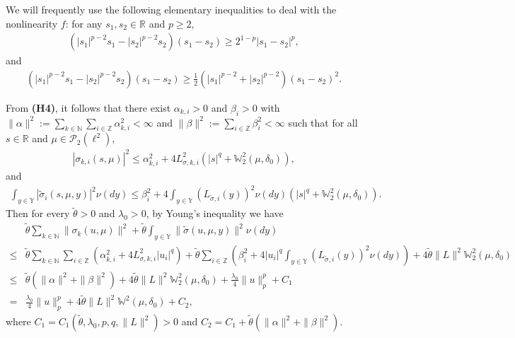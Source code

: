 \documentclass[11pt]{article}
\numberwithin{equation}{section}
\theoremstyle{plain}
\begin{document}
 We will frequently use the following elementary inequalities to deal with 
 the nonlinearity $f$:
 for any $ s_1, s_2 \in \mathbb{R} $ and $ p \ge 2 $,
 \begin{align*}
   \left( |s_1|^{ p-2 } s_1 - |s_2|^{p-2} s_2 \right) (s_1 - s_2)
    \ge 2^{1-p} |s_1 - s_2|^p,
 \end{align*}
 and
 \begin{align*}
   (|s_1|^{p-2} s_1 - |s_2|^{p-2} s_2)(s_1 - s_2)
   \ge \frac{1}{2} (|s_1|^{p-2} + |s_2|^{p-2}) (s_1 - s_2)^2.
 \end{align*}

  From {\bf(H4)}, it follows that there exist 
   $\alpha_{k,i}>0$
   and
   $\beta_i>0$
     with
    $\| \alpha \|^2 := \sum_{k \in \mathbb{N}} \sum_{i \in \mathbb{Z}} \alpha_{k,i}^2 <  \infty$
    and $\| \beta \|^2 :=   \sum_{i \in \mathbb{Z}} \beta_{i}^2 <  \infty$
    such that for all $s \in \mathbb{R}$ and $\mu \in \mathcal{P}_2(\ell^2)$,
 \begin{align}\label{siglinear-1}
    |\sigma_{k,i}(s, \mu)|^2
    \le   \alpha_{k,i}^2
         + 4L_{\sigma, k,i}^2
           \left( |s|^{q}
                  + \mathbb{W}^2_2(\mu,\delta_0)
           \right),
 \end{align}
 and
 \begin{align}\label{siglinear-2}
     \int_{y\in \mathbb{Y} }
              |\widetilde{\sigma}_i(s, \mu, y)| ^2 \nu (dy)
    \le \beta_{i}^2
         + 4 \int_{y\in \mathbb{Y} }
            \left( L_{ \widetilde{\sigma}, i}(y)
            \right)^2 \nu(dy)
            \left( |s|^{q}
                     + \mathbb{W}^2_2(\mu, \delta_0)
            \right).
 \end{align}
  Then for  every  $\tilde{\theta} > 0$
  and $\lambda_0>0$, 
  by Young's inequality we have
 \begin{align}\label{sigma3}
       & \tilde{\theta}\sum_{k \in \mathbb{N}}  \|\sigma_k(u,\mu)\|^2
           +  \tilde{\theta} \int_{y \in \mathbb{Y} } \|\widetilde{\sigma} (u,\mu,y)\|^2 \nu (dy)    \nonumber\\
 \le & \tilde{\theta} \sum_{k \in \mathbb{N}} \sum_{i \in \mathbb{Z}}
             \left( \alpha^2_{k,i} 
                     + 4L_{\sigma, k, i}^2 |u_i|^{q} 
             \right)
          + \tilde{\theta} 
                 \sum_{i \in \mathbb{Z}}
                       \left( \beta^2_{i} 
                               + 4 |u_i|^{q}
                                      \int_{y \in \mathbb{Y} }
                                          \left( L_{\widetilde{\sigma}, {i}}(y)
                                          \right)^2 \nu(dy)
                       \right)
           + 4 \tilde{\theta} \|L\|^2 \mathbb{W}^2_2(\mu,\delta_0)  \nonumber\\
 \le & \tilde{\theta} ( \| \alpha \|^2 + \|\beta\|^2)
          + 4 \tilde{\theta} \|L\|^2 \mathbb{W}_2^2(\mu,\delta_0)
          + \frac{\lambda_0}{4} \| u \|^p_p
          + C_1  \nonumber\\
   = & \frac{\lambda_0}{4} \| u \|^p_p
          + 4 \tilde{\theta} \|L\|^2 \mathbb{W}^2(\mu,\delta_0)
          +C_2,
 \end{align}
 where
 $C_1 = C_1(\tilde{\theta}, \lambda_0, p, q, \|L\|^2) > 0$ and
 $C_2= C_1 + \tilde{\theta}( \| \alpha \|^2 + \|\beta\|^2)$.
 
\end{document}
